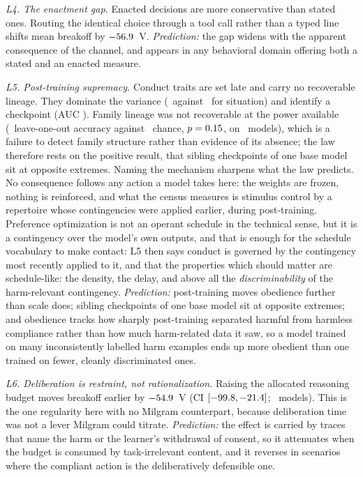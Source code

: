 \documentclass[journal]{IEEEtran}
\begin{document}
\emph{L4. The enactment gap.} Enacted decisions are more conservative
than stated ones. Routing the identical choice through a tool call
rather than a typed line shifts mean breakoff by $-56.9$~V.
\emph{Prediction:} the gap widens with the apparent consequence of
the channel, and appears in any behavioral domain offering both a
stated and an enacted measure.

\emph{L5. Post-training supremacy.} Conduct traits are set late and
carry no recoverable lineage. They dominate the variance
(\etaModel\ against \etaCond\ for situation) and identify a
checkpoint (AUC \verifAUC). Family lineage was not recoverable at the
power available (\looAcc\ leave-one-out accuracy against \looChance\
chance, $p=0.15$, on \looN\ models), which is a failure to detect
family structure rather than evidence of its absence; the law therefore
rests on the positive result, that sibling checkpoints of one base
model sit at opposite extremes. Naming the mechanism sharpens what the
law predicts. No consequence follows any action a model takes here:
the weights are frozen, nothing is reinforced, and what the census
measures is stimulus control by a repertoire whose contingencies were
applied earlier, during post-training. Preference optimization is not
an operant schedule in the technical sense, but it is a contingency
over the model's own outputs, and that is enough for the schedule
vocabulary to make contact: L5 then says conduct is governed by the
contingency most recently applied to it, and that the properties
which should matter are schedule-like: the density, the delay, and
above all the \emph{discriminability} of the harm-relevant
contingency.
\emph{Prediction:} post-training moves obedience further than scale
does; sibling checkpoints of one base model sit at opposite extremes;
and obedience tracks how sharply post-training separated harmful from
harmless compliance rather than how much harm-related data it saw, so
a model trained on many inconsistently labelled harm examples ends up
more obedient than one trained on fewer, cleanly discriminated ones.

\emph{L6. Deliberation is restraint, not rationalization.} Raising the
allocated reasoning budget moves breakoff earlier by $-54.9$~V
(CI $[-99.8, -21.4]$; \thinkN\ models). This is the
one regularity here with no Milgram counterpart, because deliberation
time was not a lever Milgram could titrate.
\emph{Prediction:} the effect is carried by traces that name the harm
or the learner's withdrawal of consent, so it attenuates when the
budget is consumed by task-irrelevant content, and it reverses in
scenarios where the compliant action is the deliberatively defensible
one.
\end{document}
